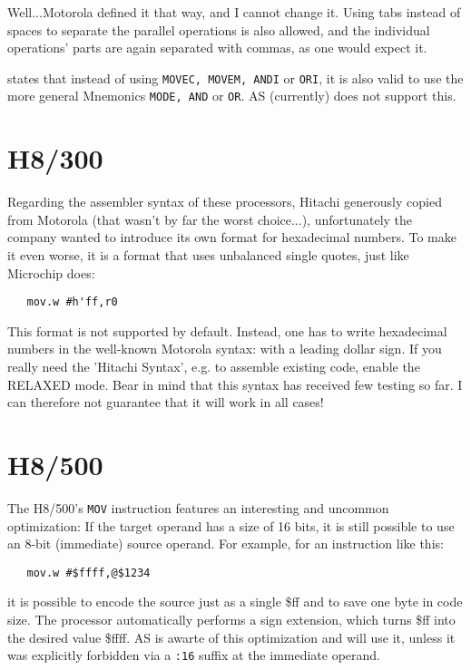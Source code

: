 \documentclass[12pt,twoside]{report}
\newcommand{\tty}[1]{{\tt #1}}
\begin{document}
Well...Motorola defined it that way, and I cannot change it.  Using
tabs instead of spaces to separate the parallel operations is also
allowed, and the individual operations' parts are again separated
with commas, as one would expect it.

\cite{Mot56} states that instead of using \tty{MOVEC, MOVEM, ANDI} or
\tty{ORI}, it is also valid to use the more general Mnemonics \tty{MODE,
AND} or \tty{OR}.
AS (currently) does not support this.


\section{H8/300}

Regarding the assembler syntax of these processors, Hitachi generously
copied from Motorola (that wasn't by far the worst choice...),
unfortunately the company wanted to introduce its own format for
hexadecimal numbers.  To make it even worse, it is a format that uses
unbalanced single quotes, just like Microchip does:
\begin{verbatim}
   mov.w #h'ff,r0
\end{verbatim}
This format is not supported by default.  Instead, one has to write
hexadecimal numbers in the well-known Motorola syntax: with a leading
dollar sign.  If you really need the 'Hitachi Syntax', e.g. to assemble
existing code, enable the RELAXED mode.  Bear in mind that this syntax has
received few testing so far.  I can therefore not guarantee that it will
work in all cases!


\section{H8/500}

The H8/500's {\tt MOV} instruction features an interesting and uncommon
optimization: If the target operand has a size of 16 bits, it is still possible
to use an 8-bit (immediate) source operand.  For example, for an instruction
like this:
\begin{verbatim}
   mov.w #$ffff,@$1234
\end{verbatim}
it is possible to encode the source just as a single \$ff and to save one
byte in code size.  The processor automatically performs a sign extension,
which turns \$ff into the desired value \$ffff.  AS is awarte of this
optimization and will use it, unless it was explicitly forbidden via a \tty{:16}
suffix at the immediate operand.
\end{document}
